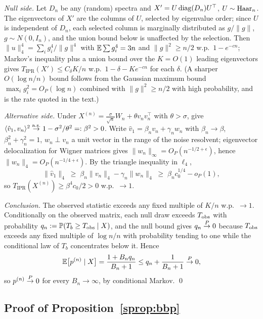 \emph{Null side.} Let $D_n$ be any (random) spectra and
$X'=U\operatorname{diag}(D_n)U^\top$, $U\sim\mathrm{Haar}_n$. The eigenvectors of $X'$ are
the columns of $U$, selected by eigenvalue order; since $U$ is
independent of $D_n$, each selected column is marginally distributed as
$g/\lVert g\rVert$, $g\sim N(0,I_n)$, and the union bound below is
unaffected by the selection. Then
$\lVert u\rVert_4^4=\sum_ig_i^4/\lVert g\rVert^4$ with
$\mathbb{E}\sum g_i^4=3n$ and $\lVert g\rVert^2\ge n/2$ w.p.\
$1-e^{-cn}$; Markov's inequality plus a union bound over the $K=O(1)$
leading eigenvectors gives
$T_{\mathrm{IPR}}(X')\le C_\delta K/n$ w.p.\ $1-\delta-Ke^{-cn}$ for each
$\delta$. (A sharper $O(\log n/n)$ bound follows from
the Gaussian maximum bound $\max_i g_i^2=O_P(\log n)$ combined with
$\lVert g\rVert^2\ge n/2$ with high probability, and is the rate quoted
in the text.)

\emph{Alternative side.} Under
$X^{(n)}=\tfrac{\sigma}{\sqrt n}W_n+\theta v_nv_n^\top$ with
$\theta>\sigma$, \citet{benaych2011eigenvalues} give
$\langle\hat v_1,v_n\rangle^2\overset{\mathrm{a.s.}}{\to}1-\sigma^2/\theta^2=:\beta^2>0$. Write
$\hat v_1=\beta_n v_n+\gamma_n w_n$ with $\beta_n\to\beta$,
$\beta_n^2+\gamma_n^2=1$, $w_n\perp v_n$ a unit vector in the range of
the noise resolvent; eigenvector delocalization for Wigner matrices
\citep{orourke2016eigenvectors} gives
$\lVert w_n\rVert_\infty=O_P(n^{-1/2+\epsilon})$, hence
$\lVert w_n\rVert_4=O_P(n^{-1/4+\epsilon})$. By the triangle inequality
in $\ell_4$,
\[
\lVert\hat v_1\rVert_4\;\ge\;\beta_n\lVert v_n\rVert_4-
\gamma_n\lVert w_n\rVert_4
\;\ge\;\beta_n c_0^{1/4}-o_P(1),
\]
so $T_{\mathrm{IPR}}(X^{(n)})\ge\beta^4c_0/2>0$ w.p.\ $\to1$.

\emph{Conclusion.} The observed statistic exceeds any fixed multiple of
$K/n$ w.p.\ $\to1$. Conditionally on the observed matrix, each null
draw exceeds $T_{\rm obs}$ with probability
$q_n:=\mathbb{P}(T_b\ge T_{\rm obs}\mid X)$, and the null bound gives
$q_n\overset{P}{\to}0$ because $T_{\rm obs}$ exceeds any fixed multiple of
$\log n/n$ with probability tending to one while the conditional law
of $T_b$ concentrates below it. Hence
\[
\mathbb{E}\bigl[p^{(n)}\mid X\bigr]
=\frac{1+B_nq_n}{B_n+1}
\le q_n+\frac1{B_n+1}\overset{P}{\to}0,
\]
so $p^{(n)}\overset{P}{\to}0$ for every $B_n\to\infty$, by conditional Markov. \qed

\subsection{Proof of Proposition~\ref{sprop:bbp}}

